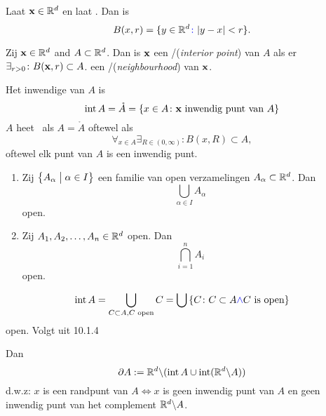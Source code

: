 \documentclass{2wa40summary}
\begin{document}
\begin{define}[Bol]
Laat ${\textbf{x}}\in\mathbb{R}^d$ en laat . Dan is 
\[
B(x,r)=\lbrace y \in \mathbb{R}^d {\color{blue}\colon} {\left|y-x\right|}<r\rbrace.
\]
\end{define}
\begin{define} Zij ${\textbf{x}} \in \mathbb{R}^d$ and $A \subset \mathbb{R}^d$. Dan is ${\textbf{x}}$ een
/(\textit{interior point}) van $A$
als er $\exists_{r>0}\colon B({\textbf{x}},r) \subset A$.
 een /(\textit{neighbourhood}) van ${\textbf{x}}$.
\end{define}
\begin{define}
              Het inwendige van $A$ is
              \[\operatorname{\mathop{int}} A=\mathring{A}=\left\lbrace x \in A \colon {\textbf{x}} \text{ inwendig punt van } A\right\rbrace\]
              $A$ heet \ als $A=\mathring{A}$ oftewel als
\[
\forall _{x \in A} \exists _{R \in (0,\infty)}\colon B(x,R) \subset A,
\]
oftewel elk punt van $A$ is een inwendig punt.
\end{define}
\begin{theorem}
          \begin{enumerate}[(1)]
                \item Zij $\left\lbrace A_\alpha \bigm| \alpha \in I \right\rbrace$ een familie van open verzamelingen $A_\alpha \subset \mathbb{R}^d$. Dan 
\[
\bigcup_{\alpha \in I}A_\alpha
\]
open.
                \item Zij $A_1,A_2,\dots,A_n \in \mathbb{R}^d$ open. Dan 
\[
\bigcap_{i=1}^{n}A_i
\]
open.
          \end{enumerate}
\end{theorem}
\begin{theorem}[Open]
            \item \[\operatorname{\mathop{int}} A=\bigcup_{C \subset A, C \text{ open} }C=\bigcup \left\lbrace C \colon C \subset A {\color{blue}\wedge} C \text{ is open}\right\rbrace\]
             open. Volgt uit   10.1.4
\end{theorem}
\begin{define}[Rand]
 Dan
\[\partial A:= \mathbb{R}^d\backslash (\operatorname{\mathop{int}} A \cup \operatorname{\mathop{int}} (\mathbb{R}^d\backslash A))\]
d.w.z: $x$ is een randpunt van $A \iff x$ is geen inwendig punt van $A$ en geen inwendig punt van het complement $\mathbb{R}^d\backslash A$.
\end{define}
\end{document}
